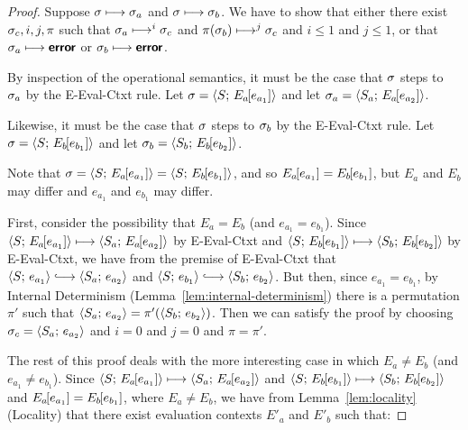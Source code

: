 \begin{proof}
  Suppose $\sigma \longmapsto \sigma_a$ and $\sigma \longmapsto \sigma_b$.
  We have to show that either there exist $\sigma_c, i, j, \pi$ such
  that $\sigma_a \longmapsto^i \sigma_c$ and $\pi(\sigma_b) \longmapsto^j
  \sigma_c$ and $i \leq 1$ and $j \leq 1$, or that $\sigma_a \longmapsto
  \textbf{\textsf{error}}$ or $\sigma_b \longmapsto \textbf{\textsf{error}}$.

  By inspection of the operational semantics, it must be the case that
  $\sigma$ steps to $\sigma_a$ by the {\sc E-Eval-Ctxt} rule.  Let
  $\sigma = \langle S;\, E_a\hspace{-1mm}\left[e_{a_1}\right] \rangle$ and let $\sigma_a =
  \langle S_a;\, E_a\hspace{-1mm}\left[e_{a_2}\right] \rangle$.

  Likewise, it must be the case that $\sigma$ steps to $\sigma_b$ by the
  {\sc E-Eval-Ctxt} rule.  Let $\sigma =
  \langle S;\, E_b\hspace{-1mm}\left[e_{b_1}\right] \rangle$ and let $\sigma_b =
  \langle S_b;\, E_b\hspace{-1mm}\left[e_{b_2}\right] \rangle$.

  Note that $\sigma = \langle S;\, E_a\hspace{-1mm}\left[e_{a_1}\right] \rangle =
  \langle S;\, E_b\hspace{-1mm}\left[e_{b_1}\right] \rangle$, and so
  $E_a\hspace{-1mm}\left[e_{a_1}\right] = E_b\hspace{-1mm}\left[e_{b_1}\right]$, but $E_a$ and
  $E_b$ may differ and $e_{a_1}$ and $e_{b_1}$ may differ.

  First, consider the possibility that $E_a = E_b$ (and $e_{a_1} =
  e_{b_1}$).  Since $\langle S;\, E_a\hspace{-1mm}\left[e_{a_1}\right] \rangle \longmapsto
  \langle S_a;\, E_a\hspace{-1mm}\left[e_{a_2}\right] \rangle$ by {\sc E-Eval-Ctxt} and
  $\langle S;\, E_b\hspace{-1mm}\left[e_{b_1}\right] \rangle \longmapsto
  \langle S_b;\, E_b\hspace{-1mm}\left[e_{b_2}\right] \rangle$ by {\sc E-Eval-Ctxt}, we have
  from the premise of {\sc E-Eval-Ctxt} that $\config{S}{e_{a_1}}
  \parstepsto \config{S_a}{e_{a_2}}$ and $\config{S}{e_{b_1}}
  \parstepsto \config{S_b}{e_{b_2}}$.  But then, since $e_{a_1} =
  e_{b_1}$, by Internal Determinism
  (Lemma~\ref{lem:internal-determinism}) there is a permutation $\pi'$
  such that $\langle S_a;\, e_{a_2} \rangle = \pi'(\langle S_b;\, e_{b_2} \rangle)$.
  Then we can satisfy the proof by choosing $\sigma_c =
  \langle S_a;\, e_{a_2} \rangle$ and $i = 0$ and $j = 0$ and $\pi = \pi'$.

  The rest of this proof deals with the more interesting case in which
  $E_a \neq E_b$ (and $e_{a_1} \neq e_{b_1}$).  Since
  $\langle S;\, E_a\hspace{-1mm}\left[e_{a_1}\right] \rangle \longmapsto
  \langle S_a;\, E_a\hspace{-1mm}\left[e_{a_2}\right] \rangle$ and
  $\langle S;\, E_b\hspace{-1mm}\left[e_{b_1}\right] \rangle \longmapsto
  \langle S_b;\, E_b\hspace{-1mm}\left[e_{b_2}\right] \rangle$ and $E_a\hspace{-1mm}\left[e_{a_1}\right]
  = E_b\hspace{-1mm}\left[e_{b_1}\right]$, where $E_a \neq E_b$, we have from
  Lemma~\ref{lem:locality} (Locality) that there exist evaluation
  contexts $E'_a$ and $E'_b$ such that:


\end{proof}
